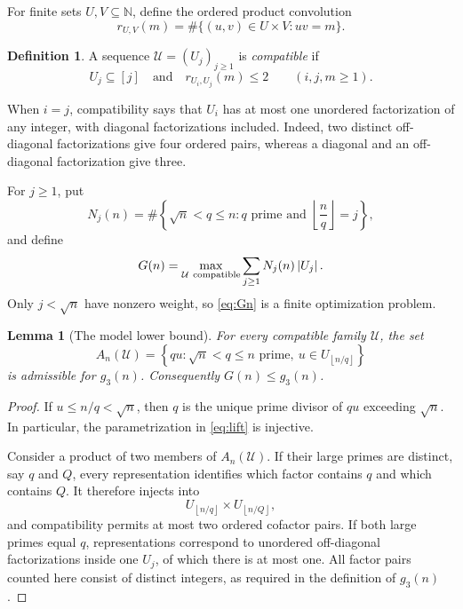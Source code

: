\documentclass[11pt,reqno]{article}
\newtheorem{lemma}[theorem]{Lemma}
\theoremstyle{definition}
\newtheorem{definition}[theorem]{Definition}
\newcommand{\N}{\mathbb N}
\newcommand{\Ucal}{\mathcal U}
\newcommand{\floor}[1]{\left\lfloor #1\right\rfloor}
\newcommand{\abs}[1]{\left|#1\right|}
\begin{document}
For finite sets \(U,V\subseteq\N\), define the ordered product convolution
\[
  r_{U,V}(m)
  =\#\{(u,v)\in U\times V:uv=m\}.
\]

\begin{definition}\label{def:compatible}
A sequence \(\Ucal=(U_j)_{j\geq1}\) is \emph{compatible} if
\[
  U_j\subseteq[j]
  \quad\text{and}\quad
  r_{U_i,U_j}(m)\leq2
  \qquad(i,j,m\geq1).
\]
\end{definition}

When \(i=j\), compatibility says that \(U_i\) has at most one unordered
factorization of any integer, with diagonal factorizations included.  Indeed,
two distinct off-diagonal factorizations give four ordered pairs, whereas a
diagonal and an off-diagonal factorization give three.

For \(j\geq1\), put
\begin{equation}\label{eq:Nj}
  N_j(n)=\#\left\{\sqrt n<q\leq n:q\text{ prime and }
      \floor{\frac nq}=j\right\},
\end{equation}
and define
\begin{equation}\label{eq:Gn}
  G(n)=\max_{\Ucal\ {\rm compatible}}
       \sum_{j\geq1}N_j(n)\abs{U_j}.
\end{equation}
Only \(j<\sqrt n\) have nonzero weight, so \eqref{eq:Gn} is a finite
optimization problem.

\begin{lemma}[The model lower bound]\label{lem:model-lower}
For every compatible family \(\Ucal\), the set
\begin{equation}\label{eq:lift}
  A_n(\Ucal)=
  \left\{qu:\sqrt n<q\leq n\text{ prime},\
     u\in U_{\floor{n/q}}\right\}
\end{equation}
is admissible for \(g_3(n)\).  Consequently \(G(n)\leq g_3(n)\).
\end{lemma}

\begin{proof}
If \(u\leq n/q<\sqrt n\), then \(q\) is the unique prime divisor of \(qu\)
exceeding \(\sqrt n\).  In particular, the parametrization in
\eqref{eq:lift} is injective.

Consider a product of two members of \(A_n(\Ucal)\).  If their large primes
are distinct, say \(q\) and \(Q\), every representation identifies which
factor contains \(q\) and which contains \(Q\).  It therefore injects into
\[
  U_{\floor{n/q}}\times U_{\floor{n/Q}},
\]
and compatibility permits at most two ordered cofactor pairs.  If both
large primes equal \(q\), representations correspond to unordered
off-diagonal factorizations inside one \(U_j\), of which there is at most
one.  All factor pairs counted here consist of distinct integers, as
required in the definition of \(g_3(n)\).
\end{proof}
\end{document}

